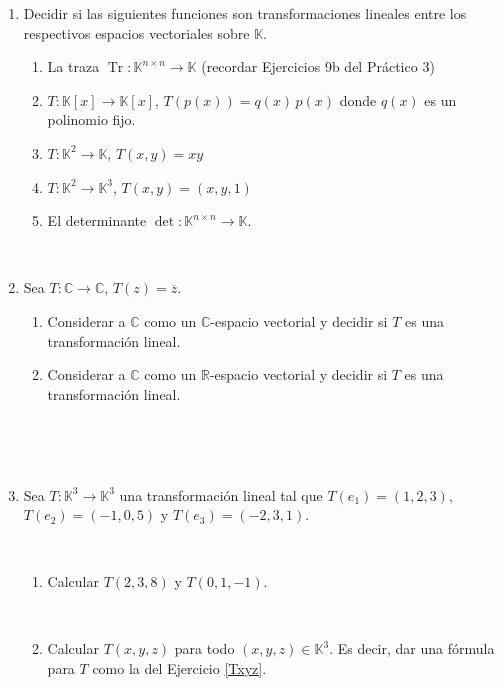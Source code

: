\documentclass[12pt]{amsart}
\begin{document}
\begin{enumerate}[resume, topsep=5pt,itemsep=5pt]
\item Decidir si las siguientes funciones son transformaciones lineales entre los respectivos espacios vectoriales sobre $\mathbb{K}$.
\begin{enumerate}[resume, topsep=5pt,itemsep=5pt]
 \item La traza $\operatorname{Tr}:\mathbb{K}^{n\times n}\longrightarrow\mathbb{K}$ (recordar Ejercicios 9b del Pr\'actico 3) 
 \item $T:\mathbb{K}[x]\longrightarrow\mathbb{K}[x]$, $T(p(x))=q(x)\,p(x)$ donde $q(x)$ es un polinomio fijo.
 \item $T:\mathbb{K}^2\longrightarrow\mathbb{K}$, $T(x,y)=xy$
 \item $T:\mathbb{K}^2\longrightarrow\mathbb{K}^3$, $T(x,y)=(x,y,1)$
 \item El determinante $\operatorname{det}:\mathbb{K}^{n\times n}\longrightarrow\mathbb{K}$.
\end{enumerate}

\

\item Sea $T:\mathbb{C}\longrightarrow\mathbb{C}$, $T(z)=\overline{z}$.
\begin{enumerate}
 \item Considerar a $\mathbb{C}$ como un $\mathbb{C}$-espacio vectorial y decidir si $T$ es una transformaci\'on lineal.
 \item Considerar a $\mathbb{C}$ como un $\mathbb{R}$-espacio vectorial y decidir si $T$ es una transformaci\'on lineal.
\end{enumerate}

    
\

\
	
    \item\label{T en la base} Sea $T:\mathbb{K}^3\longrightarrow\mathbb{K}^3$ una transformaci\'on lineal tal que $T(e_1)=(1,2,3)$, $T(e_2)=(-1,0,5)$ y $T(e_3)=(-2,3,1)$. 
    
    \
    
    \begin{enumerate}
     \item Calcular $T(2,3,8)$ y $T(0,1,-1)$. 
    
    \
    
     \item\label{T en la base b} Calcular $T(x,y,z)$ para todo $(x,y,z)\in\mathbb{K}^3$. Es decir, dar una f\'ormula para $T$ como la del Ejercicio \eqref{Txyz}.
     

\end{enumerate}
\end{enumerate}
\end{document}
